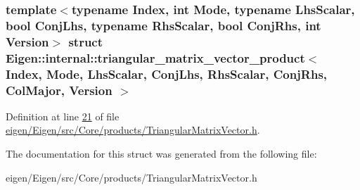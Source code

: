 \subsubsection*{template$<$typename Index, int Mode, typename Lhs\+Scalar, bool Conj\+Lhs, typename Rhs\+Scalar, bool Conj\+Rhs, int Version$>$\newline
struct Eigen\+::internal\+::triangular\+\_\+matrix\+\_\+vector\+\_\+product$<$ Index, Mode, Lhs\+Scalar, Conj\+Lhs, Rhs\+Scalar, Conj\+Rhs, Col\+Major, Version $>$}



Definition at line \hyperlink{eigen_2_eigen_2src_2_core_2products_2_triangular_matrix_vector_8h_source_l00021}{21} of file \hyperlink{eigen_2_eigen_2src_2_core_2products_2_triangular_matrix_vector_8h_source}{eigen/\+Eigen/src/\+Core/products/\+Triangular\+Matrix\+Vector.\+h}.



The documentation for this struct was generated from the following file\+:\begin{DoxyCompactItemize}
\item 
eigen/\+Eigen/src/\+Core/products/\+Triangular\+Matrix\+Vector.\+h\end{DoxyCompactItemize}
